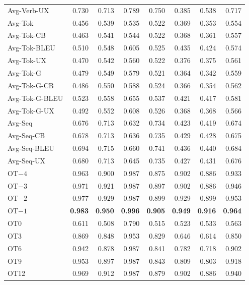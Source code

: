 {\begin{table}[t]
\begin{tabular}{@{}lrrrrrrr@{}}
Avg-Verb-UX & 0.730 & 0.713 & 0.789 & 0.750 & 0.385 & 0.538 & 0.717 \\
\addlinespace
Avg-Tok & 0.456 & 0.539 & 0.535 & 0.522 & 0.369 & 0.353 & 0.554 \\
Avg-Tok-CB & 0.463 & 0.541 & 0.544 & 0.522 & 0.368 & 0.361 & 0.557 \\
Avg-Tok-BLEU & 0.510 & 0.548 & 0.605 & 0.525 & 0.435 & 0.424 & 0.574 \\
Avg-Tok-UX & 0.470 & 0.542 & 0.560 & 0.522 & 0.376 & 0.375 & 0.561 \\
Avg-Tok-G & 0.479 & 0.549 & 0.579 & 0.521 & 0.364 & 0.342 & 0.559 \\
Avg-Tok-G-CB & 0.486 & 0.550 & 0.588 & 0.524 & 0.366 & 0.354 & 0.562 \\
Avg-Tok-G-BLEU & 0.523 & 0.558 & 0.655 & 0.537 & 0.421 & 0.417 & 0.581 \\
Avg-Tok-G-UX & 0.492 & 0.552 & 0.608 & 0.526 & 0.368 & 0.368 & 0.566 \\
\addlinespace
Avg-Seq & 0.676 & 0.713 & 0.632 & 0.734 & 0.423 & 0.419 & 0.674 \\
Avg-Seq-CB & 0.678 & 0.713 & 0.636 & 0.735 & 0.429 & 0.428 & 0.675 \\
Avg-Seq-BLEU & 0.694 & 0.715 & 0.660 & 0.741 & 0.436 & 0.440 & 0.684 \\
Avg-Seq-UX & 0.680 & 0.713 & 0.645 & 0.735 & 0.427 & 0.431 & 0.676 \\
\addlinespace
OT$-4$ & 0.963 & 0.900 & 0.987 & 0.875 & 0.902 & 0.886 & 0.933 \\
OT$-3$ & 0.971 & 0.921 & 0.987 & 0.897 & 0.902 & 0.886 & 0.946 \\
OT$-2$ & 0.977 & 0.929 & 0.987 & 0.899 & 0.929 & 0.899 & 0.953 \\
OT$-1$ & \textbf{0.983} & \textbf{0.950} & \textbf{0.996} & \textbf{0.905} & \textbf{0.949} & \textbf{0.916} & \textbf{0.964} \\
OT0 & 0.611 & 0.508 & 0.790 & 0.515 & 0.523 & 0.533 & 0.563 \\
OT3 & 0.869 & 0.848 & 0.953 & 0.829 & 0.646 & 0.614 & 0.850 \\
OT6 & 0.942 & 0.878 & 0.987 & 0.841 & 0.782 & 0.718 & 0.902 \\
OT9 & 0.953 & 0.897 & 0.987 & 0.843 & 0.809 & 0.803 & 0.918 \\
OT12 & 0.969 & 0.912 & 0.987 & 0.879 & 0.902 & 0.886 & 0.940 \\
\bottomrule
\end{tabular}
\end{table}
}

